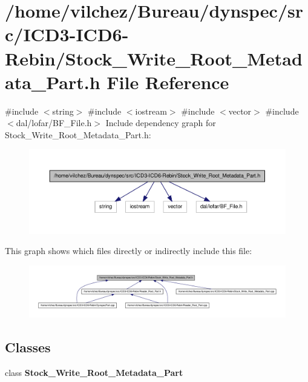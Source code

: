 \section{/home/vilchez/\-Bureau/dynspec/src/\-I\-C\-D3-\/\-I\-C\-D6-\/\-Rebin/\-Stock\-\_\-\-Write\-\_\-\-Root\-\_\-\-Metadata\-\_\-\-Part.h \-File \-Reference}
\label{_stock___write___root___metadata___part_8h}
{\ttfamily \#include $<$string$>$}\*
{\ttfamily \#include $<$iostream$>$}\*
{\ttfamily \#include $<$vector$>$}\*
{\ttfamily \#include $<$dal/lofar/\-B\-F\-\_\-\-File.\-h$>$}\*
\-Include dependency graph for \-Stock\-\_\-\-Write\-\_\-\-Root\-\_\-\-Metadata\-\_\-\-Part.\-h\-:\nopagebreak
\begin{figure}[H]
\begin{center}
\leavevmode
\includegraphics[width=350pt]{_stock___write___root___metadata___part_8h__incl}
\end{center}
\end{figure}
\-This graph shows which files directly or indirectly include this file\-:\nopagebreak
\begin{figure}[H]
\begin{center}
\leavevmode
\includegraphics[width=350pt]{_stock___write___root___metadata___part_8h__dep__incl}
\end{center}
\end{figure}
\subsection*{\-Classes}
\begin{DoxyCompactItemize}
\item 
class {\bf \-Stock\-\_\-\-Write\-\_\-\-Root\-\_\-\-Metadata\-\_\-\-Part}
\end{DoxyCompactItemize}
